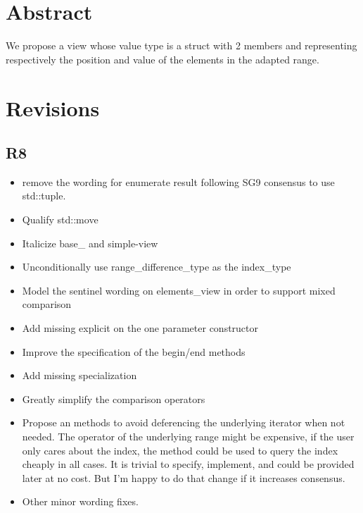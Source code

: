 \documentclass{wg21}
\title{\tcode{views::enumerate}}
\author{Corentin Jabot}{corentin.jabot@gmail.com}
\begin{document}
\maketitle
{}

\section{Abstract}

We propose a view  whose value type is a struct with 2 members  and 
representing respectively the position and value of the elements in the adapted range.

\section{Revisions}

\subsection{R8}
\begin{itemize}
	\item remove the wording for enumerate result following SG9 consensus to use std::tuple.
	\item Qualify std::move
	\item Italicize base_ and simple-view
	\item Unconditionally use range_difference_type as the index_type
	\item Model the sentinel wording on elements_view in order to support mixed comparison
	\item  Add missing explicit on the one parameter constructor
	\item Improve the specification of the begin/end methods
	\item Add missing  specialization
	\item Greatly simplify the comparison operators
	\item Propose an  methods to avoid deferencing the underlying iterator when not needed. The \tcode{*} operator
	of the underlying range might be expensive, if the user only cares about the index, the  method could be used
	to query the index cheaply in all cases. It is trivial to specify, implement, and could be provided later at no cost. But I'm happy
	to do that change if it increases consensus.
	\item Other minor wording fixes.
\end{itemize}
\end{document}
